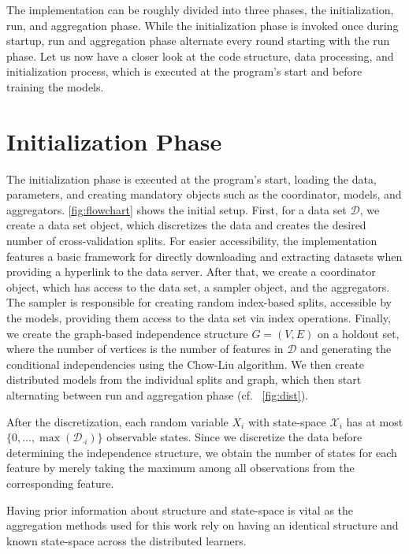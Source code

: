 The implementation can be roughly divided into three phases, the initialization, run, and aggregation phase.
While the initialization phase is invoked once during startup, run and aggregation phase alternate every round starting with the run phase.
Let us now have a closer look at the code structure, data processing, and initialization process, which is executed at the program's start and before training the models. 

\section{Initialization Phase}

The initialization phase is executed at the program's start, loading the data, parameters, and creating mandatory objects such as the coordinator, models, and aggregators.
\fig \ref{fig:flowchart} shows the initial setup.
First, for a data set $\mathcal{D}$, we create a data set object, which discretizes the data and creates the desired number of cross-validation splits. 
For easier accessibility, the implementation features a basic framework for directly downloading and extracting datasets when providing a hyperlink to the data server.
After that, we create a coordinator object, which has access to the data set, a sampler object, and the aggregators.
The sampler is responsible for creating random index-based splits, accessible by the models, providing them access to the data set via index operations.
Finally, we create the graph-based independence structure $G=(V,E)$  on a holdout set, where the number of vertices is the number of features in $\mathcal{D}$ and generating the conditional independencies using the Chow-Liu algorithm.
We then create distributed models from the individual splits and graph, which then start alternating between run and aggregation phase (cf. \fig~\ref{fig:dist}).

After the discretization, each random variable $X_i$ with state-space $\mathcal{X}_i$ has at most $\{0, \ldots, \max(\mathcal{D}_{\cdot i})\}$ observable states.
Since we discretize the data before determining the independence structure, we obtain the number of states for each feature by merely taking the maximum among all observations from the corresponding feature. 

Having prior information about structure and state-space is vital as the aggregation methods used for this work rely on having an identical structure and known state-space across the distributed learners.

